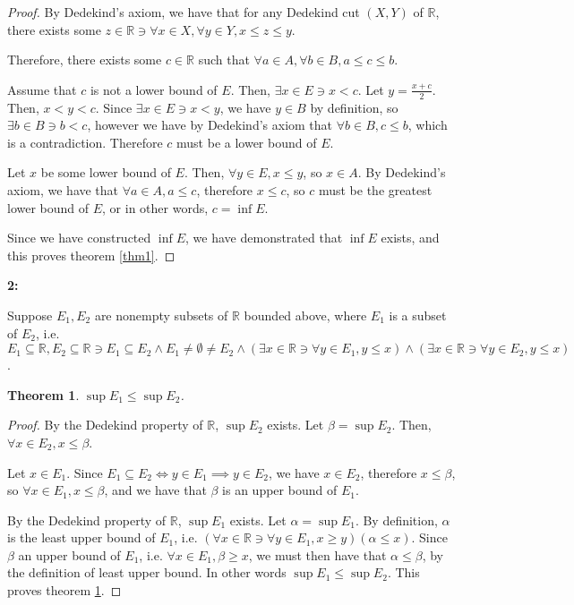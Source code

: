 \documentclass{article}
\newcommand{\reals}{\mathbb{R}}
\newtheorem{thm}{Theorem}
\begin{document}
\begin{proof}
	By Dedekind's axiom,
	we have that for any Dedekind cut $(X,Y)$ of $\reals$,
	there exists some $z \in \reals \ni \forall x \in X, \forall y \in Y, x \le z \le y$.

	Therefore, there exists some $c \in \reals$
	such that $\forall a \in A, \forall b \in B, a \le c \le b$.

	Assume that $c$ is not a lower bound of $E$.
	Then, $\exists x \in E \ni x < c$.
	Let $y = \frac{x + c}{2}$.
	Then, $x < y < c$.
	Since $\exists x \in E \ni x < y$,
	we have $y \in B$ by definition,
	so $\exists b \in B \ni b < c$,
	however we have by Dedekind's axiom
	that $\forall b \in B, c \le b$,
	which is a contradiction.
	Therefore $c$ must be a lower bound of $E$.

	Let $x$ be some lower bound of $E$.
	Then, $\forall y \in E, x \le y$, so $x \in A$.
	By Dedekind's axiom, we have that
	$\forall a \in A, a \le c$,
	therefore $x \le c$,
	so $c$ must be the greatest lower bound of $E$,
	or in other words, $c = \inf E$.

	Since we have constructed $\inf E$,
	we have demonstrated that $\inf E$ exists,
	and this proves theorem \ref{thm1}.

\end{proof}

\medskip
\textbf{2:}

Suppose $E_1, E_2$ are nonempty subsets of $\reals$ bounded above, where $E_1$ is a subset of $E_2$,
i.e. $E_1 \subseteq \reals, E_2 \subseteq \reals \ni E_1 \subseteq E_2 \land E_1 \neq \emptyset \neq E_2
\land (\exists x \in \reals \ni \forall y \in E_1, y \le x)
\land (\exists x \in \reals \ni \forall y \in E_2, y \le x)$.

\begin{thm} \label{thm2}
	$\sup E_1 \le \sup E_2$.
\end{thm}

\begin{proof}
	By the Dedekind property of $\reals$,
	$\sup E_2$ exists.
	Let $\beta = \sup E_2$.
	Then, $\forall x \in E_2, x \le \beta$.

	Let $x \in E_1$.
	Since $E_1 \subseteq E_2 \iff y \in E_1 \implies y \in E_2$,
	we have $x \in E_2$,
	therefore $x \le \beta$,
	so $\forall x \in E_1, x \le \beta$,
	and we have that $\beta$ is an upper bound of $E_1$.

	By the Dedekind property of $\reals$,
	$\sup E_1$ exists.
	Let $\alpha = \sup E_1$.
	By definition, $\alpha$ is the least upper bound of $E_1$,
	i.e. $(\forall x \in \reals \ni \forall y \in E_1, x \geq y)(\alpha \le x)$.
	Since $\beta$ an upper bound of $E_1$, i.e. $\forall x \in E_1, \beta \geq x$,
	we must then have that $\alpha \le \beta$,
	by the definition of least upper bound.
	In other words $\sup E_1 \le \sup E_2$.
	This proves theorem \ref{thm2}.
\end{proof}
\end{document}
